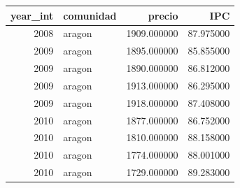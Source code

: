 \begin{tabular}{rlrr}
\toprule
year_int & comunidad & precio & IPC \\
\midrule
2008 & aragon & 1909.000000 & 87.975000 \\
2009 & aragon & 1895.000000 & 85.855000 \\
2009 & aragon & 1890.000000 & 86.812000 \\
2009 & aragon & 1913.000000 & 86.295000 \\
2009 & aragon & 1918.000000 & 87.408000 \\
2010 & aragon & 1877.000000 & 86.752000 \\
2010 & aragon & 1810.000000 & 88.158000 \\
2010 & aragon & 1774.000000 & 88.001000 \\
2010 & aragon & 1729.000000 & 89.283000 \\
\bottomrule
\end{tabular}
